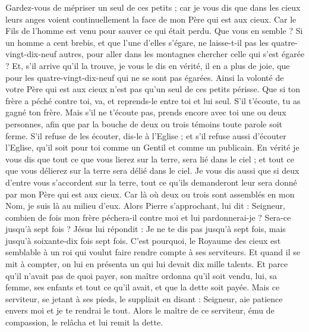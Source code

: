 \begin{multicols}{2}
Gardez-vous de mépriser un seul de ces petits ; car je vous dis que dans les cieux leurs anges voient continuellement la face de mon Père qui est aux cieux.
Car le Fils de l'homme est venu pour sauver ce qui était perdu.
Que vous en semble ? Si un homme a cent brebis, et que l'une d'elles s'égare, ne laisse-t-il pas les quatre-vingt-dix-neuf autres, pour aller dans les montagnes chercher celle qui s'est égarée ?
Et, s'il arrive qu'il la trouve, je vous le dis en vérité, il en a plus de joie, que pour les quatre-vingt-dix-neuf qui ne se sont pas égarées.
Ainsi la volonté de votre Père qui est aux cieux n'est pas qu'un seul de ces petits périsse.
Que si ton frère a péché contre toi, va, et reprends-le entre toi et lui seul. S'il t'écoute, tu as gagné ton frère.
Mais s'il ne t'écoute pas, prends encore avec toi une ou deux personnes, afin que par la bouche de deux ou trois témoins toute parole soit ferme.
S'il refuse de les écouter, dis-le à l'Eglise ; et s'il refuse aussi d'écouter l'Eglise, qu'il soit pour toi comme un Gentil et comme un publicain.
En vérité je vous dis que tout ce que vous lierez sur la terre, sera lié dans le ciel ; et tout ce que vous délierez sur la terre sera délié dans le ciel.
Je vous dis aussi que si deux d'entre vous s'accordent sur la terre, tout ce qu'ils demanderont leur sera donné par mon Père qui est aux cieux.
Car là où deux ou trois sont assemblés en mon Nom, je suis là au milieu d'eux.
Alors Pierre s'approchant, lui dit : Seigneur, combien de fois mon frère péchera-il contre moi et lui pardonnerai-je ? Sera-ce jusqu'à sept fois ?
Jésus lui répondit : Je ne te dis pas jusqu'à sept fois, mais jusqu'à soixante-dix fois sept fois.
C'est pourquoi, le Royaume des cieux est semblable à un roi qui voulut faire rendre compte à ses serviteurs.
Et quand il se mit à compter, on lui en présenta un qui lui devait dix mille talents.
Et parce qu'il n'avait pas de quoi payer, son maître ordonna qu'il soit vendu, lui, sa femme, ses enfants et tout ce qu'il avait, et que la dette soit payée.
Mais ce serviteur, se jetant à ses pieds, le suppliait en disant : Seigneur, aie patience envers moi et je te rendrai le tout.
Alors le maître de ce serviteur, ému de compassion, le relâcha et lui remit la dette.

\end{multicols}
